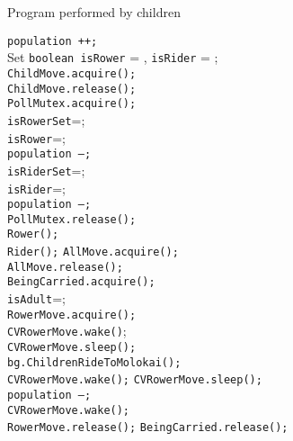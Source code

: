 \documentclass{article}
\begin{document}
\begin{spacing}{1.1}
    \begin{algorithm}
      \caption{Program performed by children}
      \begin{algorithmic}[1]
	\STATE \texttt{population ++;}\\
	\STATE Set \texttt{boolean isRower} = \FALSE, \texttt{isRider} = \FALSE;\\
	\STATE \texttt{ChildMove.acquire();}\\
	\STATE \texttt{ChildMove.release();}\\
	\STATE \texttt{PollMutex.acquire();}\\
	\STATE \texttt{isRowerSet}=\TRUE;\\
	\STATE \texttt{isRower}=\TRUE;\\
	\STATE \texttt{population --;}\\
	\STATE \texttt{isRiderSet}=\TRUE;\\
	\STATE \texttt{isRider}=\TRUE;\\
	\STATE \texttt{population --;}\\
	\ENDIF
	\STATE \texttt{PollMutex.release();}\\
	\STATE \texttt{Rower();}\\
	\RETURN
	\STATE \texttt{Rider();}
	\RETURN
	\ELSE
	\STATE \texttt{AllMove.acquire();}\\
	\STATE \texttt{AllMove.release();}\\
	\STATE \texttt{BeingCarried.acquire();}\\
	\STATE \texttt{isAdult}=\FALSE;\\
	\STATE \texttt{RowerMove.acquire();}\\
	\STATE \texttt{CVRowerMove.wake()};\\
	\STATE \texttt{CVRowerMove.sleep();}\\
	\STATE \texttt{bg.ChildrenRideToMolokai();}\\
	\STATE \texttt{CVRowerMove.wake();}
	\STATE \texttt{CVRowerMove.sleep();}\\
	\STATE \texttt{population --;}\\
	\STATE \texttt{CVRowerMove.wake();}\\
	\STATE \texttt{RowerMove.release();}
	\STATE \texttt{BeingCarried.release();}
	\RETURN
	\ENDIF
      \end{algorithmic}
    \end{algorithm}


\end{spacing}
\end{document}

